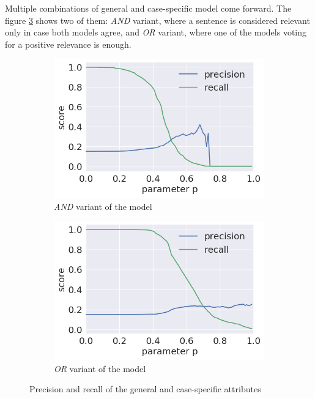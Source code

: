 \documentclass[
  digital, %
  notable,   %
  nolof,     %
  nolot,     %
]{fithesis3}
\begin{document}
Multiple combinations of general and case-specific model come forward.
The figure \ref{fig:sent_finalP} shows two of them: \textit{AND} variant, where a sentence is considered relevant only in case both models agree, and \textit{OR} variant, where one of the models voting for a positive relevance is enough.

\begin{figure}[h]
\begin{subfigure}{.5\textwidth}
  \centering
  \caption{\textit{AND} variant of the model}
  \label{fig:sent_andP}
  \includegraphics[width=\textwidth]{img/sent_andP}
\end{subfigure}%
\begin{subfigure}{.5\textwidth}
  \centering
  \caption{\textit{OR} variant of the model}
  \label{fig:sent_orP}
  \includegraphics[width=\textwidth]{img/sent_orP}
\end{subfigure}%
\caption{Precision and recall of the general and case-specific attributes}
\label{fig:sent_finalP}
\end{figure}
\end{document}
